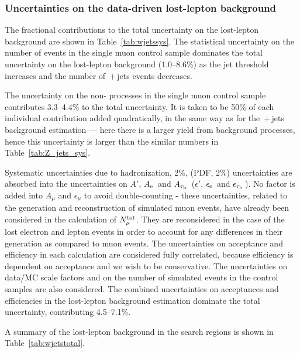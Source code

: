\subsubsection{Uncertainties on the data-driven lost-lepton background}

The fractional contributions to the total uncertainty on the lost-lepton background are shown in Table~\ref{tab:wjetssys}.
The statistical uncertainty on the number of events in the single muon control sample dominates the total uncertainty on the lost-lepton background (1.0--8.6\%) as the jet threshold increases and the number of \wmunubr\,+\,jets events decreases. 

The uncertainty on the non-\wpj{} processes in the single muon control sample contributes 3.3--4.4\% to the total uncertainty. 
It is taken to be 50\% of each individual contribution added quadratically, in the same way as for the \znunubr\,+\,jets background estimation --- here there is a larger yield from background processes, hence this uncertainty is larger than the similar numbers in Table~\ref{tab:Z_jets_sys}.

Systematic uncertainties due to hadronization, 2\%, (PDF, 2\%) uncertainties are absorbed into the uncertainties on $A'$, $A_{\mathrm{e}\,}$ and $A_{\tau_\mathrm{h}\,}$ ($\epsilon'$, $\epsilon_{\mathrm{e}\,}$ and $\epsilon_{\tau_\mathrm{h}\,}$).
No factor is added into $A_{\mu}$ and $\epsilon_{\mu}$ to avoid double-counting - these 
uncertainties, related to the generation and reconstruction of simulated muon events, have already been considered in the calculation of $N^{\rm tot}_{\mu}$. 
They are reconsidered in the case of the lost electron and \tauh lepton events in order to account for any differences in their generation as compared to muon events.
The uncertainties on acceptance and efficiency in each calculation are considered fully correlated, 
because efficiency is dependent on acceptance and we wish to be conservative.
The uncertainties on data/MC scale factors and on the number of simulated events in the control samples are also considered.
The combined uncertainties on acceptances and efficiencies in the lost-lepton background estimation dominate the total uncertainty, contributing 4.5--7.1\%.


A summary of the lost-lepton background in the search regions is shown in Table~\ref{tab:wjetstotal}.  




